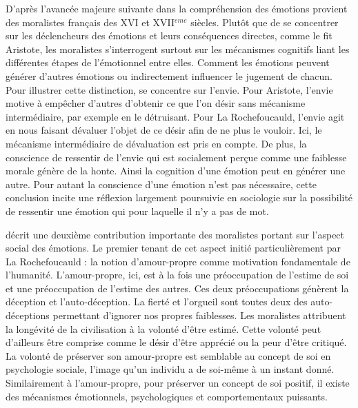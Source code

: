\documentclass[a4paper,12pt, openany]{book}
\begin{document}
D'après \textcite{elster98} l'avancée majeure suivante dans la compréhension des émotions provient des moralistes français des XVI et XVII$^{eme}$ siècles. Plutôt que de se concentrer sur les déclencheurs des émotions et leurs conséquences directes, comme le fit Aristote, les moralistes s'interrogent surtout sur les mécanismes cognitifs liant les différentes étapes de l'émotionnel entre elles. Comment les émotions peuvent générer d'autres émotions ou indirectement influencer le jugement de chacun. Pour illustrer cette distinction, \textcite{elster98} se concentre sur l'envie. Pour Aristote, l'envie motive à empêcher d'autres d'obtenir ce que l'on désir sans mécanisme intermédiaire, par exemple en le détruisant. Pour La Rochefoucauld, l'envie agit en nous faisant dévaluer l'objet de ce désir afin de ne plus le vouloir. Ici, le mécanisme intermédiaire de dévaluation est pris en compte. De plus, la conscience de ressentir de l'envie qui est socialement perçue comme une faiblesse morale génère de la honte. Ainsi la cognition d'une émotion peut en générer une autre. Pour autant la conscience d'une émotion n'est pas nécessaire, cette conclusion incite une réflexion largement poursuivie en sociologie sur la possibilité de ressentir une émotion qui pour laquelle il n'y a pas de mot. \par 

\textcite{elster98} décrit une deuxième contribution importante des moralistes portant sur l'aspect social des émotions. Le premier tenant de cet aspect initié particulièrement par La Rochefoucauld : la notion d'amour-propre comme motivation fondamentale de l'humanité. L'amour-propre, ici, est à la fois une préoccupation de l'estime de soi et une préoccupation de l'estime des autres. Ces deux préoccupations génèrent la déception et l'auto-déception. La fierté et l'orgueil sont toutes deux des auto-déceptions permettant d'ignorer nos propres faiblesses. Les moralistes attribuent la longévité de la civilisation à la volonté d'être estimé. Cette volonté peut d'ailleurs être comprise comme le désir d'être apprécié ou la peur d'être critiqué. La volonté de préserver son amour-propre est semblable au concept de soi en psychologie sociale, l'image qu'un individu a de soi-même à un instant donné. Similairement à l'amour-propre, pour préserver un concept de soi positif, il existe des mécanismes émotionnels, psychologiques et comportementaux puissants. \par 
\end{document}
